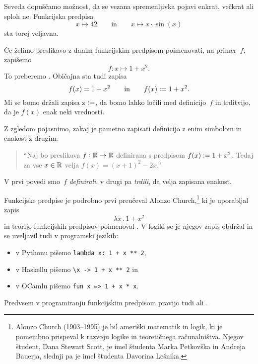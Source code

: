 Seveda dopuščamo možnost, da se vezana spremenljivka pojavi enkrat, večkrat ali sploh ne.
Funkcijska predpisa
%
%
\begin{equation*}
  x \mapsto 42
  \qquad\text{in}\qquad
  x \mapsto x \cdot \sin(x)
\end{equation*}
%
sta torej veljavna.

Če želimo preslikavo z danim funkcijskim predpisom poimenovati, na primer~$f$, zapišemo
%
\begin{equation*}
  f : x \mapsto 1 + x^2.
\end{equation*}
%
To preberemo . Običajna sta tudi zapisa
%
\begin{equation*}
  f(x) = 1 + x^2
  \qquad\text{in}\qquad
  f(x) \mathrel{{:}{=}} 1 + x^2.
\end{equation*}
%
Mi se bomo držali zapisa z $\mathrel{{:}{=}}$, da bomo lahko ločili med definicijo~$f$ in trditvijo, da je $f(x)$ enak neki vrednosti.

\begin{zgled}
  Z zgledom pojasnimo, zakaj je pametno zapisati definicijo z enim simbolom in enakost z drugim:
  \begin{quote}
    ``Naj bo preslikava $f : \mathbb{R} \to \mathbb{R}$ definirana s predpisom $f(x) \mathrel{{:}{=}} 1 + x^2$. Tedaj za vse $x \in \mathbb{R}$ velja $f(x) = (x + 1)^2 - 2 x$.'' 
  \end{quote}
  V prvi povedi smo~$f$ \emph{definirali}, v drugi pa \emph{trdili}, da velja zapisana enakost.
\end{zgled}

Funkcijske predpise je podrobno prvi preučeval Alonzo Church,\footnote{Alonzo Church
  (1903--1995) je bil ameriški matematik in logik, ki je pomembno prispeval k razvoju
  logike in teoretičnega računalništva. Njegov študent, Dana Stewart Scott, je imel
  študenta Marka Petkovška in Andreja Bauerja, slednji pa je imel študenta Davorina
  Lešnika.} ki je uporabljal zapis
%
\begin{equation*}
  \lambda x \,.\, 1 + x^2
\end{equation*}
%
in teorijo funkcijskih predpisov poimenoval . V logiki se je njegov
zapis obdržal in se uveljavil tudi v programski jezikih:
%
\begin{itemize}
\item v Pythonu pišemo \verb|lambda x: 1 + x ** 2|,
\item v Haskellu pišemo \verb|\x -> 1 + x ** 2| in
\item v OCamlu pišemo \verb|fun x => 1 + x * x|.
\end{itemize}
%
Predvsem v programiranju funkcijskim predpisom pravijo tudi  ali .


